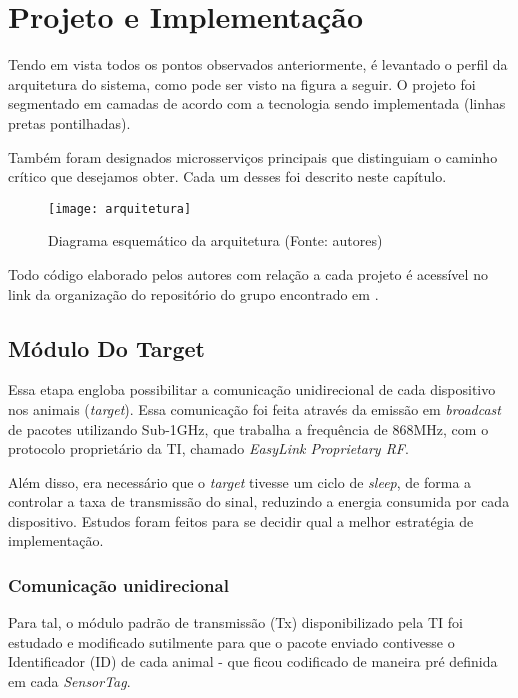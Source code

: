 \chapter{Projeto e Implementação}

Tendo em vista todos os pontos observados anteriormente, é levantado o perfil da arquitetura do sistema, como pode ser visto na figura a seguir. O projeto foi segmentado em camadas de acordo com a tecnologia sendo implementada (linhas pretas pontilhadas).

Também foram designados microsserviços principais que distinguiam o caminho crítico que desejamos obter. Cada um desses foi descrito neste capítulo.

\begin{figure}[ht]
  \centering
    \texttt{[image: arquitetura]}
  \caption{Diagrama esquemático da arquitetura (Fonte: autores)}
\end{figure}
\FloatBarrier

Todo código elaborado pelos autores com relação a cada projeto é acessível no link da organização do repositório do grupo encontrado em \cite{github}.

\section{Módulo Do Target}

Essa etapa engloba possibilitar a comunicação unidirecional de cada dispositivo nos animais (\emph{target}). Essa comunicação foi feita através da emissão em \emph{broadcast} de pacotes utilizando Sub-1GHz, que trabalha a frequência de 868MHz, com o protocolo proprietário da TI, chamado \emph{EasyLink Proprietary RF}.

Além disso, era necessário que o \emph{target} tivesse um ciclo de \emph{sleep}, de forma a controlar a taxa de transmissão do sinal, reduzindo a energia consumida por cada dispositivo. Estudos foram feitos para se decidir qual a melhor estratégia de implementação.

\subsection{Comunicação unidirecional}

Para tal, o módulo padrão de transmissão (Tx) disponibilizado pela TI foi estudado e modificado sutilmente para que o pacote enviado contivesse o Identificador (ID) de cada animal - que ficou codificado de maneira pré definida em cada \emph{SensorTag}.

